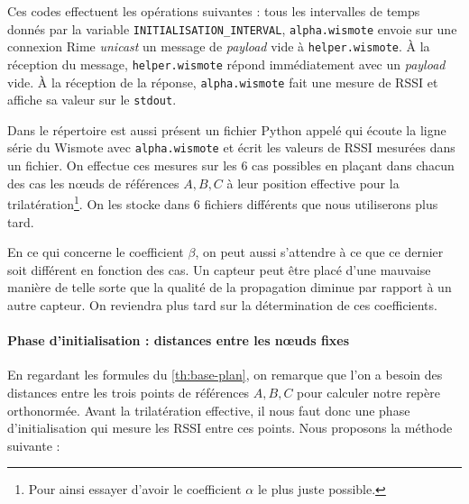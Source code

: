 \documentclass[french, a4paper, 12pt, parskip]{scrartcl}
\begin{document}
Ces codes effectuent les opérations suivantes : tous les intervalles de temps
donnés par la variable \verb+INITIALISATION_INTERVAL+, \verb+alpha.wismote+
envoie sur une connexion Rime \textit{unicast} un message de \textit{payload}
vide à \verb+helper.wismote+. À la réception du message, \verb+helper.wismote+
répond immédiatement avec un \textit{payload} vide. À la réception de la
réponse, \verb+alpha.wismote+ fait une mesure de RSSI et affiche sa valeur sur
le \verb+stdout+.

\begin{center}
\end{center}

Dans le répertoire est aussi présent un fichier Python appelé
 qui écoute la ligne série du Wismote avec
\verb+alpha.wismote+ et écrit les valeurs de RSSI mesurées dans un fichier. On
effectue ces mesures sur les 6 cas possibles en plaçant dans chacun des cas les
nœuds de références $A, B, C$ à leur position effective pour la
trilatération\footnote{Pour ainsi essayer d'avoir le coefficient $\alpha$ le
plus juste possible.}. On les stocke dans 6 fichiers différents que nous
utiliserons plus tard.

En ce qui concerne le coefficient $\beta$, on peut aussi s'attendre à ce que ce
dernier soit différent en fonction des cas. Un capteur peut être placé d'une
mauvaise manière de telle sorte que la qualité de la propagation diminue par
rapport à un autre capteur. On reviendra plus tard sur la détermination de ces
coefficients.

\paragraph{Phase d'initialisation : distances entre les nœuds fixes}

En regardant les formules du \autoref{th:base-plan}, on remarque que l'on a
besoin des distances entre les trois points de références $A, B, C$ pour
calculer notre repère orthonormée. Avant la trilatération effective, il nous
faut donc une phase d'initialisation qui mesure les RSSI entre ces points. Nous
proposons la méthode suivante :
\end{document}

